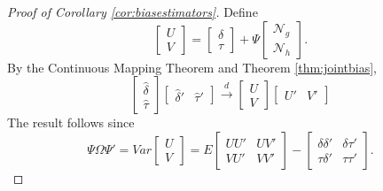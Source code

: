 \begin{proof}[Proof of Corollary \ref{cor:biasestimators}]
Define
	$$\left[\begin{array}{c} U\\ V \end{array}\right]=\left[\begin{array}{c}\delta\\ \tau\end{array} \right] +\Psi\left[\begin{array}{c}\mathscr{N}_g \\ \mathscr{N}_h \end{array}\right].$$
By the Continuous Mapping Theorem and Theorem \ref{thm:jointbias},
	$$\left[\begin{array}{c} \widehat{\delta} \\ \widehat{\tau} \end{array}\right]\left[\begin{array}{cc} \widehat{\delta}' & \widehat{\tau}'\end{array} \right] \overset{d}{\rightarrow} \left[\begin{array}{c} U\\V \end{array}\right]\left[\begin{array}{cc}U' & V'\end{array} \right] $$
The result follows since
$$\Psi\Omega\Psi' =Var\left[\begin{array}{c}U\\V\end{array}\right] = 
E\left[\begin{array}{cc} 
				UU'&UV'\\
				VU'&VV'
				\end{array}\right] - 
				\left[\begin{array}{cc}
				\delta\delta'&\delta\tau'\\
				\tau\delta'&\tau\tau'
				\end{array}\right].$$
\end{proof}






